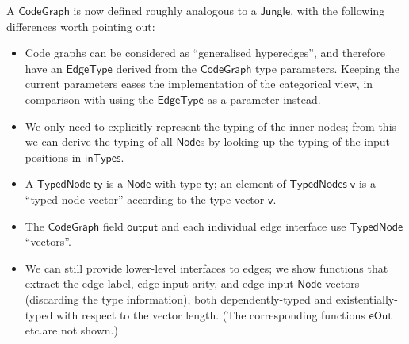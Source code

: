 \documentclass[copyright]{eptcs}
\newcommand{\Conid}[1]{\mathit{#1}}
\newcommand{\Varid}[1]{\mathit{#1}}
\renewcommand\Varid[1]{\mathord{\textsf{#1}}}
\let\Conid\Varid
\newcounter{x}
\newcounter{y}
\newcounter{z}
\begin{document}
\begin{minipage}[t]{0.49\textwidth}
\noindent
A \ensuremath{\Conid{CodeGraph}} is now defined roughly analogous to a \ensuremath{\Conid{Jungle}},
with the following differences worth pointing out:
\begin{itemize}
\item Code graphs can be considered as ``generalised hyperedges'',
  and therefore have an \ensuremath{\Conid{EdgeType}} derived from the \ensuremath{\Conid{CodeGraph}} type
  parameters. Keeping the current parameters eases the implementation
  of the categorical view, in comparison with using the \ensuremath{\Conid{EdgeType}} as
  a parameter instead.

\item We only need to explicitly represent the typing of the inner
  nodes; from this we can derive the typing of all \ensuremath{\Conid{Node}}s
  by looking up the typing of the input positions in \ensuremath{\Varid{inTypes}}.

\item A \ensuremath{\Conid{TypedNode}\;\Varid{ty}} is a \ensuremath{\Conid{Node}} with type \ensuremath{\Varid{ty}};
  an element of \ensuremath{\Conid{TypedNodes}\;\Varid{v}} is a ``typed node vector''
  according to the type vector \ensuremath{\Varid{v}}.

\item The \ensuremath{\Conid{CodeGraph}} field \ensuremath{\Varid{output}} and each individual edge
  interface use \ensuremath{\Conid{TypedNode}} ``vectors''.

\item We can still provide lower-level interfaces to edges;
  we show functions that extract the edge label,
  edge input arity,
  and edge input \ensuremath{\Conid{Node}} vectors (discarding the type information),
  both dependently-typed and existentially-typed with respect to the
  vector length.
  (The corresponding functions \ensuremath{\Varid{eOut}} etc.\null are not shown.)
\end{itemize}


\end{minipage}
\end{document}
